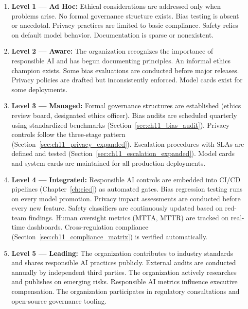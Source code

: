 \begin{enumerate}
    \item \textbf{Level 1 --- Ad Hoc:} Ethical considerations are addressed only when problems arise. No formal governance structure exists. Bias testing is absent or anecdotal. Privacy practices are limited to basic compliance. Safety relies on default model behavior. Documentation is sparse or nonexistent.
    \item \textbf{Level 2 --- Aware:} The organization recognizes the importance of responsible AI and has begun documenting principles. An informal ethics champion exists. Some bias evaluations are conducted before major releases. Privacy policies are drafted but inconsistently enforced. Model cards exist for some deployments.
    \item \textbf{Level 3 --- Managed:} Formal governance structures are established (ethics review board, designated ethics officer). Bias audits are scheduled quarterly using standardized benchmarks (Section~\ref{sec:ch11_bias_audit}). Privacy controls follow the three-stage pattern (Section~\ref{sec:ch11_privacy_expanded}). Escalation procedures with SLAs are defined and tested (Section~\ref{sec:ch11_escalation_expanded}). Model cards and system cards are maintained for all production deployments.
    \item \textbf{Level 4 --- Integrated:} Responsible AI controls are embedded into CI/CD pipelines (Chapter~\ref{ch:cicd}) as automated gates. Bias regression testing runs on every model promotion. Privacy impact assessments are conducted before every new feature. Safety classifiers are continuously updated based on red-team findings. Human oversight metrics (MTTA, MTTR) are tracked on real-time dashboards. Cross-regulation compliance (Section~\ref{sec:ch11_compliance_matrix}) is verified automatically.
    \item \textbf{Level 5 --- Leading:} The organization contributes to industry standards and shares responsible AI practices publicly. External audits are conducted annually by independent third parties. The organization actively researches and publishes on emerging risks. Responsible AI metrics influence executive compensation. The organization participates in regulatory consultations and open-source governance tooling.
\end{enumerate}

